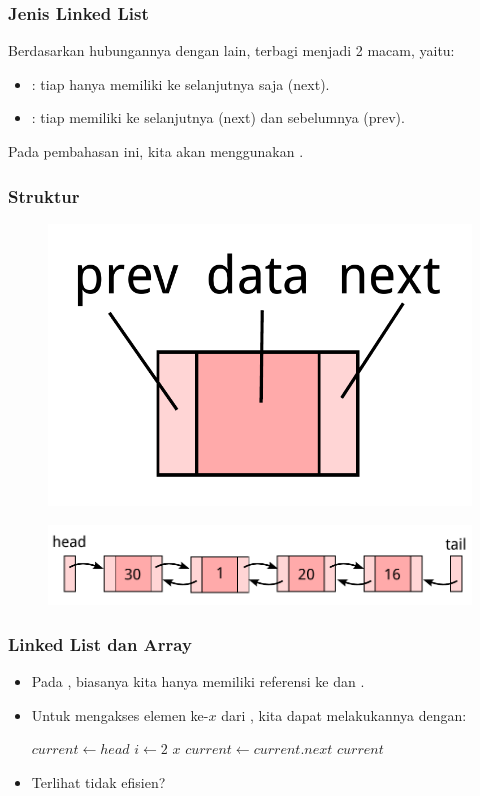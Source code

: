 \begin{frame}
\frametitle{Jenis Linked List}
Berdasarkan hubungannya dengan  lain,  terbagi menjadi 2 macam, yaitu:
\begin{itemize}
  \item {}: tiap  hanya memiliki  ke  selanjutnya saja (next).
  \item {}: tiap  memiliki  ke  selanjutnya (next) dan  sebelumnya (prev).
  \newline
\end{itemize}
Pada pembahasan ini, kita akan menggunakan .
\end{frame}

\begin{frame}
\frametitle{Struktur }
\begin{figure}
  \centering
  \includegraphics[width=3 cm]{asset/doubly-node.pdf}
\end{figure}
\begin{figure}
  \centering
  \includegraphics[width=9 cm]{asset/doubly-linked-list.pdf}
\end{figure}
\end{frame}

\begin{frame}
\frametitle{Linked List dan Array}
\begin{itemize}
  \item Pada , biasanya kita hanya memiliki referensi ke  dan .
  \item Untuk mengakses elemen ke-$x$ dari , kita dapat melakukannya dengan:

  \begin{codebox}
  \li $current \gets head$
  \li \For $i \gets 2$ \To $x$ \Do
  \li   $current \gets current.next$
      \End
  \li \Return $current$
  \zi
  \end{codebox}
  \item Terlihat tidak efisien?
\end{itemize}
\end{frame}

